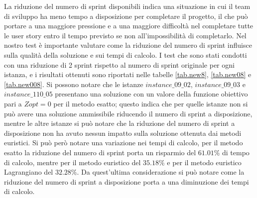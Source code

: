 \documentclass[12pt,a4paper,openright,twoside]{book}
\begin{document}
La riduzione del numero di sprint disponibili indica una situazione in cui il team di sviluppo ha meno tempo a disposizione per completare il progetto, il che può portare a una maggiore pressione e a una maggiore difficoltà nel completare tutte le user story entro il tempo previsto se non all'impossibilità di completarlo.
Nel nostro test è importante valutare come la riduzione del numero di sprint influisce sulla qualità della soluzione e sui tempi di calcolo. I test che sono stati condotti con una riduzione di 2 sprint rispetto al numero di sprint originale per ogni istanza, e i risultati ottenuti sono riportati nelle tabelle \ref{tab.new8}, \ref{tab.new08} e \ref{tab.new008}.
Si possono notare che le istanze $instance\_09\_02$, $instance\_09\_03$ e $instance\_110\_05$ presentano una soluzione con un valore della funzione obiettivo pari a $Zopt = 0$ per il metodo esatto; questo indica che per quelle istanze non si può avere una soluzione ammissibile riducendo il numero di sprint a disposizione, mentre le altre istanze si può notare che la riduzione del numero di sprint a disposizione non ha avuto nessun impatto sulla soluzione ottenuta dai metodi euristici.
Si può però notare una variazione nei tempi di calcolo, per il metodo esatto la riduzione del numero di sprint porta un risparmio del $61.01\%$ di tempo di calcolo, mentre per il metodo euristico del $35.18\%$ e per il metodo euristico Lagrangiano del $32.28\%$. Da quest'ultima considerazione si può notare come la riduzione del numero di sprint a disposizione porta a una diminuzione dei tempi di calcolo. 
\end{document}
